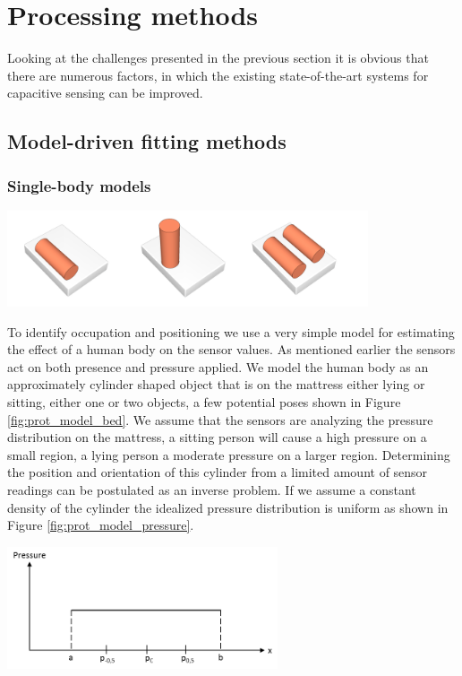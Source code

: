 \section{Processing methods}
Looking at the challenges presented in the previous section it is obvious that there are numerous factors, in which the existing state-of-the-art systems for capacitive sensing can be improved. 


\subsection{Model-driven fitting methods}
\subsubsection{Single-body models}
\begin{minipage}{\linewidth}
\centering
\includegraphics[width=0.8\textwidth]{images/prot_model_bed}
\label{fig:prot_model_bed}
\end{minipage}	

To identify occupation and positioning we use a very simple model for estimating the effect of a human body on the sensor values. As mentioned earlier the sensors act on both presence and pressure applied. We model the human body as an approximately cylinder shaped object that is on the mattress either lying or sitting, either one or two objects, a few potential poses shown in Figure \ref{fig:prot_model_bed}. We assume that the sensors are analyzing the pressure distribution on the mattress, a sitting person will cause a high pressure on a small region, a lying person a moderate pressure on a larger region. Determining the position and orientation of this cylinder from a limited amount of sensor readings can be postulated as an inverse problem. If we assume a constant density of the cylinder the idealized pressure distribution is uniform as shown in Figure \ref{fig:prot_model_pressure}.
\begin{minipage}{\linewidth}
\centering
\includegraphics[width=0.6\textwidth]{images/prot_model_pressure}
\label{fig:prot_model_pressure}
\end{minipage}

